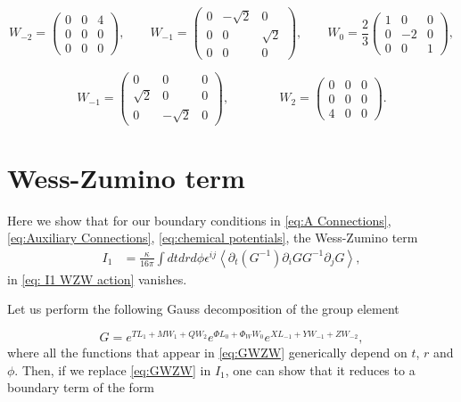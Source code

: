 \documentclass[letterpaper,11pt,oneside]{book}
\begin{document}
\[
W_{-2}=\left(\begin{array}{ccc}
	0 & 0 & 4\\
	0 & 0 & 0\\
	0 & 0 & 0
\end{array}\right),\quad\quad W_{-1}=\left(\begin{array}{ccc}
	0 & -\sqrt{2} & 0\\
	0 & 0 & \sqrt{2}\\
	0 & 0 & 0
\end{array}\right),\quad\quad W_{0}=\frac{2}{3}\left(\begin{array}{ccc}
	1 & 0 & 0\\
	0 & -2 & 0\\
	0 & 0 & 1
\end{array}\right),
\]

\[
W_{-1}=\left(\begin{array}{ccc}
	0 & 0 & 0\\
	\sqrt{2} & 0 & 0\\
	0 & -\sqrt{2} & 0
\end{array}\right),\qquad\qquad W_{2}=\left(\begin{array}{ccc}
	0 & 0 & 0\\
	0 & 0 & 0\\
	4 & 0 & 0
\end{array}\right).
\]


\chapter{Wess-Zumino term\label{Appendix 7: Wess-Zumino-term}}

Here we show that for our boundary conditions in \eqref{eq:A Connections},
\eqref{eq:Auxiliary Connections}, \eqref{eq:chemical potentials},
the Wess-Zumino term 
\begin{align*}
	I_{1} & =\frac{\kappa}{16\pi}\int dtdrd\phi\epsilon^{ij}\left\langle \partial_{t}\left(G^{-1}\right)\partial_{i}GG^{-1}\partial_{j}G\right\rangle ,
\end{align*}
in \eqref{eq: I1 WZW action} vanishes.

Let us perform the following Gauss decomposition of the group element

\begin{equation}
	G=e^{TL_{1}+MW_{1}+QW_{2}}e^{\Phi L_{0}+\Phi_{W}W_{0}}e^{XL_{-1}+YW_{-1}+ZW_{-2}},\label{eq:GWZW}
\end{equation}
where all the functions that appear in \eqref{eq:GWZW} generically
depend on $t$, $r$ and $\phi$. Then, if we replace \eqref{eq:GWZW}
in $I_{1}$, one can show that it reduces to a boundary term of the
form
\end{document}

